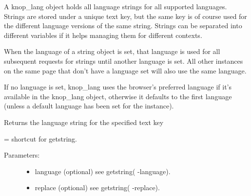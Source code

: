 \documentclass[letterpaper,10pt,english]{sphinxmanual}
\begin{document}
\begin{fulllineitems}
\label{knop_lang:knop_lang}
A knop\_lang object holds all language strings for all supported languages.
Strings are stored under a unique text key, but the same key is of course used
for the different language versions of the same string. Strings can be separated
into different variables if it helps managing them for different contexts.

When the language of a string object is set, that language is used for all
subsequent requests for strings until another language is set. All other
instances on the same page that don't have a language set will also use the same
language.

If no language is set, knop\_lang uses the browser's preferred language if it's
available in the knop\_lang object, otherwise it defaults to the first language
(unless a default language has been set for the instance).

\begin{fulllineitems}
\label{knop_lang:knop_lang._unknowntag}
\end{fulllineitems}


\begin{fulllineitems}
Returns the language string for the specified text key

= shortcut for getstring.
\begin{description}
\item[{Parameters:}] \leavevmode\begin{itemize}
\item {} 
language (optional)
see getstring( -language).

\item {} 
replace (optional)
see getstring( -replace).

\end{itemize}

\end{description}

\end{fulllineitems}


\begin{fulllineitems}
\label{knop_lang:knop_lang.addlanguage}
\end{fulllineitems}


\end{fulllineitems}
\end{document}
